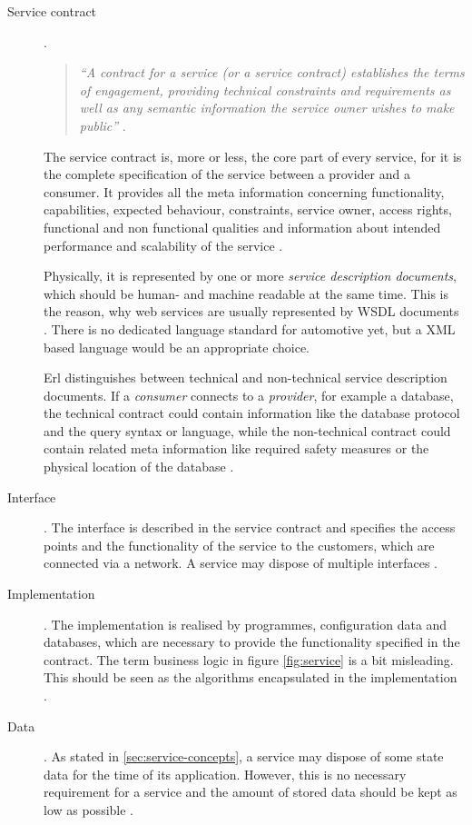 \begin{description}
\item [Service contract]. 
\begin{quote}
\emph{``A contract for a service (or a service contract) establishes the terms of engagement, providing technical constraints and requirements as well as any semantic information the service owner wishes to make public''} 
\cite[ch.6.1]{erl2008}.
\end{quote}
The service contract is, more or less, the core part of every service, for it is the complete specification of the service between a provider and a consumer. It provides all the meta information concerning functionality, capabilities, expected behaviour, constraints, service owner, access rights, functional and non functional qualities and information about intended performance and scalability of the service \cite[p.44]{krafzig} \cite[p.26]{josuttis} \cite{breivold}.

Physically, it is represented by one or more \emph{service description documents}, which should be human- and machine readable at the same time. This is the reason, why web services are usually represented by WSDL documents \cite[p.43]{erl2011}. There is no dedicated language standard for automotive yet, but a XML based language would be an appropriate choice.

Erl \cite{erl2008} distinguishes between technical and non-technical service description documents. If a \emph{consumer} connects to a \emph{provider}, for example a database, the technical contract could contain information like the database protocol and the query syntax or language, while the non-technical contract could contain related meta information like required safety measures or the physical location of the database \cite[ch.6.1]{erl2008}.

\item [Interface]. 
The interface is described in the service contract and specifies the access points and the functionality of the service to the customers, which are connected via a network. A service may dispose of multiple interfaces \cite[p.44]{krafzig} \cite{breivold}.

\item [Implementation]. 
The implementation is realised by programmes, configuration data and databases, which are necessary to provide the functionality specified in the contract. The term business logic in figure \ref{fig:service} is a bit misleading. This should be seen as the algorithms encapsulated in the implementation \cite[p.44]{krafzig}.

\item [Data].
As stated in \ref{sec:service-concepts}, a service may dispose of some state data for the time of its application. However, this is no necessary requirement for a service and the amount of stored data should be kept as low as possible \cite[p.44]{krafzig}.
\end{description}

